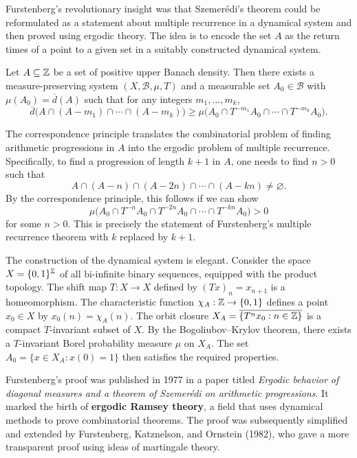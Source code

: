 Furstenberg's revolutionary insight was that Szemer\'edi's theorem could be reformulated as a statement about multiple recurrence in a dynamical system and then proved using ergodic theory. The idea is to encode the set \(A\) as the return times of a point to a given set in a suitably constructed dynamical system.

\begin{theorem}
Let \(A \subseteq \mathbb{Z}\) be a set of positive upper Banach density. Then there exists a measure-preserving system \((X,\mathscr{B},\mu,T)\) and a measurable set \(A_0 \in \mathscr{B}\) with \(\mu(A_0) = \overline{d}(A)\) such that for any integers \(m_1,\dots,m_k\),
\[
\overline{d}\bigl(A \cap (A - m_1) \cap \cdots \cap (A - m_k)\bigr) \geq \mu\bigl(A_0 \cap T^{-m_1}A_0 \cap \cdots \cap T^{-m_k}A_0\bigr).
\]
\end{theorem}

The correspondence principle translates the combinatorial problem of finding arithmetic progressions in \(A\) into the ergodic problem of multiple recurrence. Specifically, to find a progression of length \(k+1\) in \(A\), one needs to find \(n > 0\) such that
\[
A \cap (A - n) \cap (A - 2n) \cap \cdots \cap (A - kn) \neq \varnothing.
\]
By the correspondence principle, this follows if we can show
\[
\mu\bigl(A_0 \cap T^{-n}A_0 \cap T^{-2n}A_0 \cap \cdots \cap T^{-kn}A_0\bigr) > 0
\]
for some \(n > 0\). This is precisely the statement of Furstenberg's multiple recurrence theorem with \(k\) replaced by \(k+1\).

The construction of the dynamical system is elegant. Consider the space \(X = \{0,1\}^{\mathbb{Z}}\) of all bi-infinite binary sequences, equipped with the product topology. The shift map \(T: X \to X\) defined by \((Tx)_n = x_{n+1}\) is a homeomorphism. The characteristic function \(\chi_A: \mathbb{Z} \to \{0,1\}\) defines a point \(x_0 \in X\) by \(x_0(n) = \chi_A(n)\). The orbit closure \(X_A = \overline{\{T^n x_0 : n \in \mathbb{Z}\}}\) is a compact \(T\)-invariant subset of \(X\). By the Bogoliubov--Krylov theorem, there exists a \(T\)-invariant Borel probability measure \(\mu\) on \(X_A\). The set \(A_0 = \{x \in X_A : x(0) = 1\}\) then satisfies the required properties.

Furstenberg's proof was published in 1977 in a paper titled \textit{Ergodic behavior of diagonal measures and a theorem of Szemer\'edi on arithmetic progressions}. It marked the birth of \textbf{ergodic Ramsey theory}, a field that uses dynamical methods to prove combinatorial theorems. The proof was subsequently simplified and extended by Furstenberg, Katznelson, and Ornstein (1982), who gave a more transparent proof using ideas of martingale theory.

